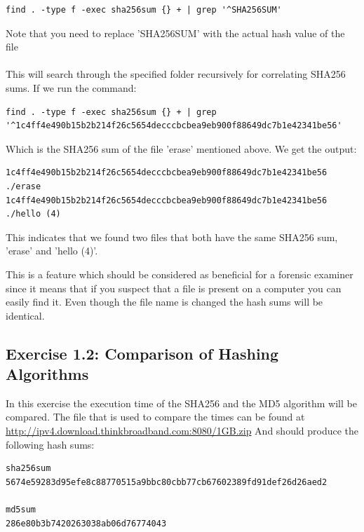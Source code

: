 \documentclass[a4paper,10pt,oneside]{article}
\begin{document}
\begin{lstlisting}[caption= Command for finding file with hash sum]
find . -type f -exec sha256sum {} + | grep '^SHA256SUM'
\end{lstlisting}

{\footnotesize *Note that you need to replace 'SHA256SUM' with the actual hash value of the file}\\\\
This will search through the specified folder recursively for correlating SHA256 sums. If we run the command:

\begin{lstlisting}[caption=Finding files with hash sum]
find . -type f -exec sha256sum {} + | grep '^1c4ff4e490b15b2b214f26c5654decccbcbea9eb900f88649dc7b1e42341be56'
\end{lstlisting}

Which is the SHA256 sum of the file 'erase' mentioned above. We get the output:

\begin{lstlisting}[caption=Result from above example]
1c4ff4e490b15b2b214f26c5654decccbcbea9eb900f88649dc7b1e42341be56  ./erase
1c4ff4e490b15b2b214f26c5654decccbcbea9eb900f88649dc7b1e42341be56  ./hello (4)
\end{lstlisting}

This indicates that we found two files that both have the same SHA256 sum, 'erase' and 'hello (4)'.

This is a feature which should be considered as beneficial for a forensic examiner since it means that if you suspect that a file is present on a computer you can
easily find it. Even though the file name is changed the hash sums will be identical.

\subsection{Exercise 1.2: Comparison of Hashing Algorithms}
In this exercise the execution time of the SHA256 and the MD5 algorithm will be compared. The file that is used to compare the times can be found at \url{http://ipv4.download.thinkbroadband.com:8080/1GB.zip}
And should produce the following hash sums:

\begin{lstlisting}[caption=Hash sums for file used in exercise]
sha256sum
5674e59283d95efe8c88770515a9bbc80cbb77cb67602389fd91def26d26aed2

md5sum
286e80b3b7420263038ab06d76774043
\end{lstlisting}
\end{document}
